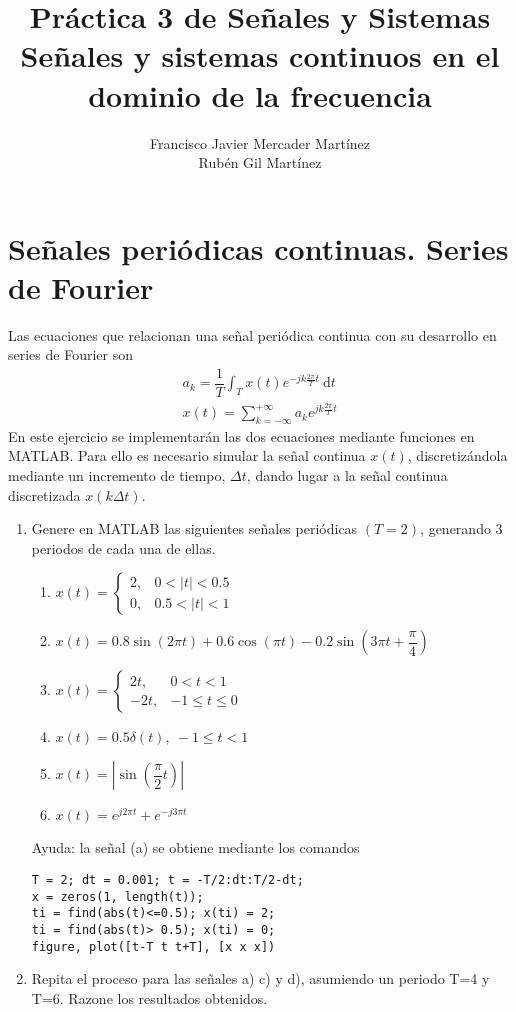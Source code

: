\documentclass{article}
\title{\textbf{\huge Práctica 3 de Señales y Sistemas}\\ Señales y sistemas continuos en el dominio de la frecuencia}
\author{Francisco Javier Mercader Martínez\\ Rubén Gil Martínez}
\date{}
\newcommand{\dt}{\:\mathrm{d}t}
\begin{document}
\section{Señales periódicas continuas. Series de Fourier}
Las ecuaciones que relacionan una señal periódica continua con su desarrollo en series de Fourier son \[ \begin{array}{l}
	a_k=\dfrac{1}{T}\int_Tx(t)e^{-jk\frac{2\pi}{T}t}\dt\\
	x(t)=\sum_{k=-\infty}^{+\infty}a_ke^{jk\frac{2\pi}{T}t}
\end{array} \]
En este ejercicio se implementarán las dos ecuaciones mediante funciones en MATLAB. Para ello es necesario simular la señal continua $x(t)$, discretizándola mediante un incremento de tiempo, $\Delta t$, dando lugar a la señal continua discretizada $x(k\Delta t)$.
\begin{enumerate}[leftmargin=*]
	\item Genere en MATLAB las siguientes señales periódicas $(T=2)$, generando 3 periodos de cada una de ellas.
	\begin{enumerate}[label=\alph*)]
		\item $x(t)=\begin{cases}
			2, & 0<|t|<0.5\\
			0,&0.5<|t|<1
		\end{cases}$
		\item $x(t)=0.8\sin(2\pi t)+0.6\cos(\pi t)-0.2\sin\left(3\pi t+\dfrac{\pi}{4}\right)$
		\item $x(t)=\begin{cases}
			2t, & 0<t<1\\
			-2t,&-1\le t\le0
		\end{cases}$
		\item $x(t)=0.5\delta(t),\:-1\le t<1$
		\item $x(t)=\left|\sin\left(\dfrac{\pi}{2}t\right)\right|$
		\item $x(t)=e^{j2\pi t}+e^{-j3\pi t}$
	\end{enumerate}
	
	Ayuda: la señal (a) se obtiene mediante los comandos
	\begin{lstlisting}
T = 2; dt = 0.001; t = -T/2:dt:T/2-dt;
x = zeros(1, length(t));
ti = find(abs(t)<=0.5); x(ti) = 2;
ti = find(abs(t)> 0.5); x(ti) = 0;
figure, plot([t-T t t+T], [x x x])
	\end{lstlisting}
	\item Repita el proceso para las señales a) c) y d), asumiendo un periodo T=4 y T=6. Razone los resultados obtenidos.
	

\end{enumerate}
\end{document}
